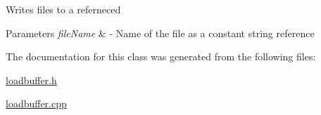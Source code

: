 Writes files to a referneced 
\begin{DoxyParams}{Parameters}
{\em file\+Name} & -\/ Name of the file as a constant string reference \\
\hline
\end{DoxyParams}


The documentation for this class was generated from the following files\+:\begin{DoxyCompactItemize}
\item 
\hyperlink{loadbuffer_8h}{loadbuffer.\+h}\item 
\hyperlink{loadbuffer_8cpp}{loadbuffer.\+cpp}\end{DoxyCompactItemize}
